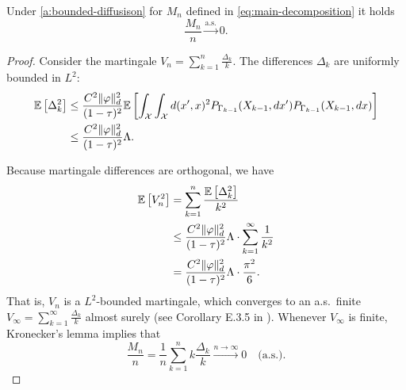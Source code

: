 \begin{lemma}
Under \ref{a:bounded-diffusison} for $M_n$ defined in \ref{eq:main-decomposition} it holds
\[
    \frac{M_n}{n} \xrightarrow{\text{a.s.}} 0.
\]
\begin{proof}
    Consider the martingale $V_n=\sum_{k=1}^n\frac{\Delta_k}{k}$.
    The differences $\Delta_k$ are uniformly bounded in $L^2$:
    \begin{align*}
         \mathbb{E} \left[ \Delta_k^2 \right] &\leq \frac{C^2 \| \varphi \|_{d}^2}{(1- \tau)^2} \mathbb{E} \left[ \int_{\mathcal{X}} \int_{\mathcal{X}} d(x', x)^2
            P_{\Gamma_{k-1}}(X_{k-1}, dx')
            P_{\Gamma_{k-1}}(X_{k-1}, dx)  \right] \\
            &\leq \frac{C^2 \| \varphi \|_{d}^2}{(1- \tau)^2} \Lambda .
    \end{align*}
        
    Because martingale differences are orthogonal, we have
    \begin{align*}
       \mathbb{E} \left[ V_n^2 \right] &=
       \sum_{k=1}^n\frac{\mathbb{E} \left[ \Delta_k^2 \right]}{k^2} \\
       &\leq \frac{C^2 \| \varphi \|_{d}^2}{(1- \tau)^2} \Lambda \cdot\sum_{k=1}^\infty \frac{1}{k^2} \\
       &= \frac{C^2 \| \varphi \|_{d}^2}{(1- \tau)^2} \Lambda \cdot \frac{\pi^2}{6}.
    \end{align*}
    That is, $V_n$ is a $L^2$-bounded martingale, which converges to an a.s.~finite $V_\infty = \sum_{k=1}^\infty\frac{\Delta_k}{k}$ almost surely (see Corollary E.3.5 in \cite{douc2018markov}). Whenever $V_\infty$ is finite, Kronecker's lemma implies that 
    \begin{equation*}
        \frac{M_n}{n}=\frac{1}{n}\sum_{k=1}^n k \frac{\Delta_k}{k}\xrightarrow{n\to\infty} 0 \quad\text{(a.s.)}.
    \end{equation*}
\end{proof}
\end{lemma}


